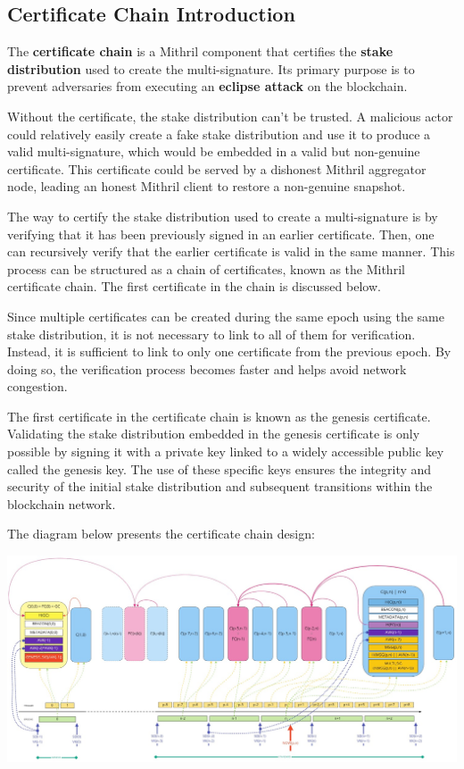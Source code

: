 \documentclass{article}
\begin{document}
\subsection{Certificate Chain Introduction}

The \textbf{certificate chain} is a Mithril component that certifies the \textbf{stake distribution} used to create the multi-signature. Its primary purpose is to prevent adversaries from executing an \textbf{eclipse attack} on the blockchain.

Without the certificate, the stake distribution can't be trusted. A malicious actor could relatively easily create a fake stake distribution and use it to produce a valid multi-signature, which would be embedded in a valid but non-genuine certificate. This certificate could be served by a dishonest Mithril aggregator node, leading an honest Mithril client to restore a non-genuine snapshot.


The way to certify the stake distribution used to create a multi-signature is by verifying that it has been previously signed in an earlier certificate. Then, one can recursively verify that the earlier certificate is valid in the same manner. This process can be structured as a chain of certificates, known as the Mithril certificate chain. The first certificate in the chain is discussed below.


Since multiple certificates can be created during the same epoch using the same stake distribution, it is not necessary to link to all of them for verification. Instead, it is sufficient to link to only one certificate from the previous epoch. By doing so, the verification process becomes faster and helps avoid network congestion.


The first certificate in the certificate chain is known as the genesis certificate. Validating the stake distribution embedded in the genesis certificate is only possible by signing it with a private key linked to a widely accessible public key called the genesis key. The use of these specific keys ensures the integrity and security of the initial stake distribution and subsequent transitions within the blockchain network.

The diagram below presents the certificate chain design:


\includegraphics[width=1\linewidth]{certificate-chain-e700241394649f948e0aab47b0f881c9.jpg}
\end{document}
